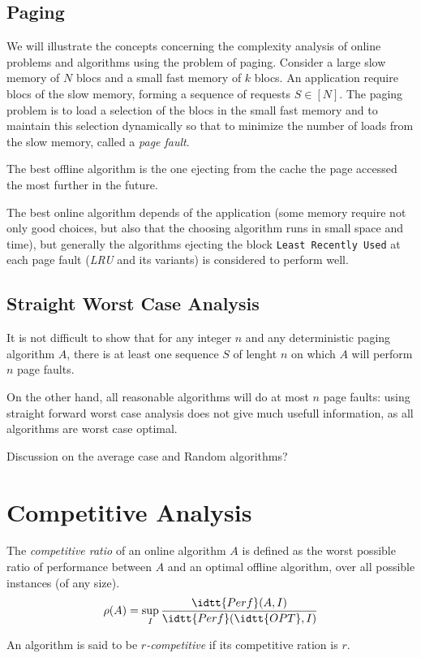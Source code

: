 \subsection{Paging}
\label{sec:paging}


We will illustrate the concepts concerning the complexity analysis of
online problems and algorithms using the problem of paging.
%
Consider a large slow memory of $N$ blocs and a small fast memory of
$k$ blocs. 
%
An application require blocs of the slow memory, forming a sequence of
requests $S\in[N]$.
%
The paging problem is to load a selection of the blocs in the small
fast memory and to maintain this selection dynamically so that to
minimize the number of loads from the slow memory, called a \emph{page
  fault}.


The best offline algorithm is the one ejecting from the cache the page
accessed the most further in the future.

The best online algorithm depends of the application (some memory
require not only good choices, but also that the choosing algorithm
runs in small space and time), but generally the algorithms ejecting
the block \texttt{Least Recently Used} at each page fault (\emph{LRU}
and its variants) is considered to perform well.



\subsection{Straight Worst Case Analysis}
\label{sec:straight-worst-case}

It is not difficult to show that for any integer $n$ and any
deterministic paging algorithm $A$, there is at least one sequence $S$
of lenght $n$ on which $A$ will perform $n$ page faults.

On the other hand, all reasonable algorithms will do at most $n$ page
faults: using straight forward worst case analysis does not give much
usefull information, as all algorithms are worst case optimal.

\begin{NOTE}
  Discussion on the average case and Random algorithms?
\end{NOTE}


\section{Competitive Analysis}
\label{sec:competitive-analysis}

\begin{definition}
  The \emph{competitive ratio} of an online algorithm $A$ is defined
  as the worst possible ratio of performance between $A$ and an
  optimal offline algorithm, over all possible instances (of any
  size).
  $$\rho(A) 
  = 
  \sup_I \frac{\idtt{Perf}(A,I)}{\idtt{Perf}(\idtt{OPT},I)}$$

  An algorithm is said to be \emph{$r$-competitive} if its competitive
  ration is $r$.
\end{definition}


